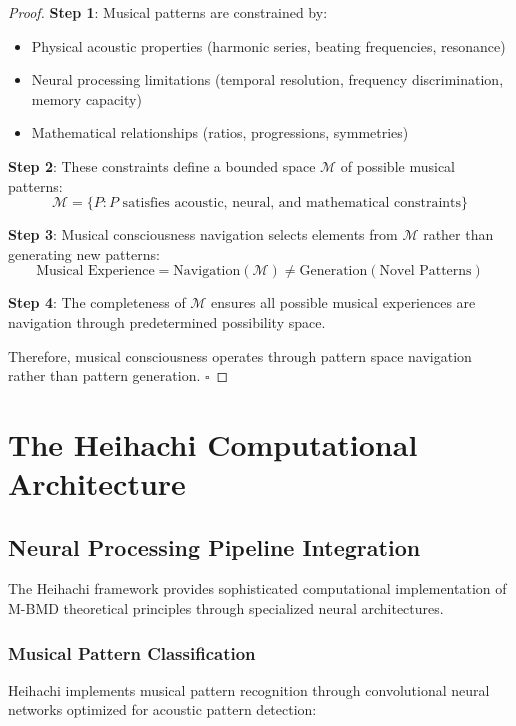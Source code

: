 \documentclass[12pt,a4paper]{article}
\begin{document}
\begin{proof}
\textbf{Step 1}: Musical patterns are constrained by:
\begin{itemize}
\item Physical acoustic properties (harmonic series, beating frequencies, resonance)
\item Neural processing limitations (temporal resolution, frequency discrimination, memory capacity)
\item Mathematical relationships (ratios, progressions, symmetries)
\end{itemize}

\textbf{Step 2}: These constraints define a bounded space $\mathcal{M}$ of possible musical patterns:
$$\mathcal{M} = \{P : P \text{ satisfies acoustic, neural, and mathematical constraints}\}$$

\textbf{Step 3}: Musical consciousness navigation selects elements from $\mathcal{M}$ rather than generating new patterns:
$$\text{Musical Experience} = \text{Navigation}(\mathcal{M}) \neq \text{Generation}(\text{Novel Patterns})$$

\textbf{Step 4}: The completeness of $\mathcal{M}$ ensures all possible musical experiences are navigation through predetermined possibility space.

Therefore, musical consciousness operates through pattern space navigation rather than pattern generation. $\square$
\end{proof}

\section{The Heihachi Computational Architecture}

\subsection{Neural Processing Pipeline Integration}

The Heihachi framework provides sophisticated computational implementation of M-BMD theoretical principles through specialized neural architectures.

\subsubsection{Musical Pattern Classification}

Heihachi implements musical pattern recognition through convolutional neural networks optimized for acoustic pattern detection:
\end{document}
